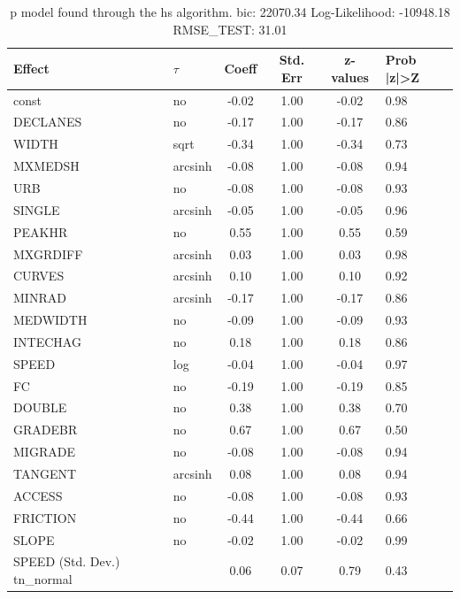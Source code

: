 \begin{table}
	\caption{p model found through the hs algorithm. bic: 22070.34 Log-Likelihood: -10948.18 RMSE_TEST: 31.01}
	\begin{center}
		\begin{tabular}{|l|l|c|c|c|l|}
			\hline
			Effect & $\tau$ & Coeff & Std. Err & z-values & Prob |z|>Z \\
			\hline
			const & no & -0.02 & 1.00 & -0.02 & 0.98 \\
			\hline
			DECLANES & no & -0.17 & 1.00 & -0.17 & 0.86 \\
			\hline
			WIDTH & sqrt & -0.34 & 1.00 & -0.34 & 0.73 \\
			\hline
			MXMEDSH & arcsinh & -0.08 & 1.00 & -0.08 & 0.94 \\
			\hline
			URB & no & -0.08 & 1.00 & -0.08 & 0.93 \\
			\hline
			SINGLE & arcsinh & -0.05 & 1.00 & -0.05 & 0.96 \\
			\hline
			PEAKHR & no & 0.55 & 1.00 & 0.55 & 0.59 \\
			\hline
			MXGRDIFF & arcsinh & 0.03 & 1.00 & 0.03 & 0.98 \\
			\hline
			CURVES & arcsinh & 0.10 & 1.00 & 0.10 & 0.92 \\
			\hline
			MINRAD & arcsinh & -0.17 & 1.00 & -0.17 & 0.86 \\
			\hline
			MEDWIDTH & no & -0.09 & 1.00 & -0.09 & 0.93 \\
			\hline
			INTECHAG & no & 0.18 & 1.00 & 0.18 & 0.86 \\
			\hline
			SPEED & log & -0.04 & 1.00 & -0.04 & 0.97 \\
			\hline
			FC & no & -0.19 & 1.00 & -0.19 & 0.85 \\
			\hline
			DOUBLE & no & 0.38 & 1.00 & 0.38 & 0.70 \\
			\hline
			GRADEBR & no & 0.67 & 1.00 & 0.67 & 0.50 \\
			\hline
			MIGRADE & no & -0.08 & 1.00 & -0.08 & 0.94 \\
			\hline
			TANGENT & arcsinh & 0.08 & 1.00 & 0.08 & 0.94 \\
			\hline
			ACCESS & no & -0.08 & 1.00 & -0.08 & 0.93 \\
			\hline
			FRICTION & no & -0.44 & 1.00 & -0.44 & 0.66 \\
			\hline
			SLOPE & no & -0.02 & 1.00 & -0.02 & 0.99 \\
			\hline
			SPEED (Std. Dev.) tn_normal &  & 0.06 & 0.07 & 0.79 & 0.43 \\

\end{tabular}
\end{center}
\end{table}
